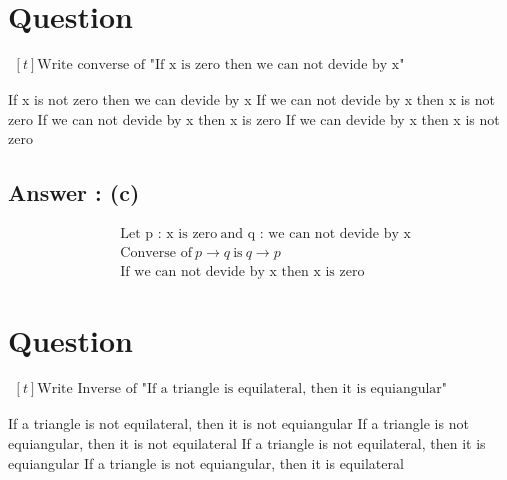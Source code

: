 \documentclass[17pt]{extarticle}
\begin{document}
\noindent
\begin{fleqn} 


\section{Question} 
$\begin{aligned}[t] 
\text {Write converse of "If x is zero then we can not devide by x" } 
\end{aligned}$

\begin{tasks}
  \task If x is not zero then we can devide by x 
  \task If we can not devide by x then x is not zero 
  \task If we can not devide by x then x is zero
  \task If we can devide by x then x is not zero
\end{tasks}
\subsection*{Answer : (c)}
\begin{equation} \nonumber
\begin{alignedat}{4}
& \text {Let p : x is zero}   
 \ \text {and q : we can not devide by x} \\ 
& \text {Converse of} \ p \to q \ \text {is} \ q \to p\\
& \text {If we can not devide by x then x is zero } 
\end{alignedat}
\end{equation}

\section{Question} 

$\begin{aligned}[t] 
\text {Write Inverse of "If a triangle is equilateral, then it is equiangular" } 
\end{aligned}$

\begin{tasks}
  \task If a triangle is not equilateral, then it is not equiangular 
  \task If a triangle is not equiangular, then it is not equilateral 
  \task If a triangle is not equilateral, then it is equiangular
  \task If a triangle is not equiangular, then it is equilateral
\end{tasks}

\end{fleqn}
\end{document}
